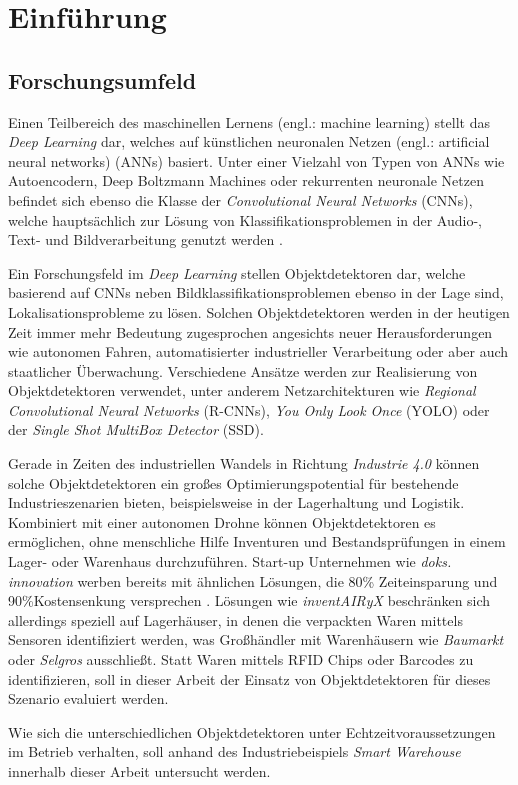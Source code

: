 \chapter{Einführung}

\section{Forschungsumfeld}

Einen Teilbereich des maschinellen Lernens (engl.: machine learning) stellt das \textit{Deep Learning} dar, welches auf künstlichen neuronalen Netzen (engl.: artificial neural networks) (ANNs) basiert. Unter einer Vielzahl von Typen von ANNs wie Autoencodern, Deep Boltzmann Machines oder rekurrenten neuronale Netzen befindet sich ebenso die Klasse der \textit{Convolutional Neural Networks} (CNNs), welche hauptsächlich zur Lösung von Klassifikationsproblemen in der Audio-, Text- und Bildverarbeitung genutzt werden \cite{AurelienGeron.2018,TaoWangDavidJ.WuAdamCoatesAndrewY.Ng.2012}.

Ein Forschungsfeld im \textit{Deep Learning} stellen Objektdetektoren dar, welche basierend auf CNNs neben Bildklassifikationsproblemen ebenso in der Lage sind, Lokalisationsprobleme zu lösen. Solchen Objektdetektoren werden in der heutigen Zeit immer mehr Bedeutung zugesprochen angesichts neuer Herausforderungen wie autonomen Fahren, automatisierter industrieller Verarbeitung oder aber auch staatlicher Überwachung. Verschiedene Ansätze werden zur Realisierung von Objektdetektoren verwendet, unter anderem Netzarchitekturen wie \textit{Regional Convolutional Neural Networks} (R-CNNs), \textit{You Only Look Once} (YOLO) oder der \textit{Single Shot MultiBox Detector} (SSD). 

Gerade in Zeiten des industriellen Wandels in Richtung \textit{Industrie 4.0} können solche Objektdetektoren ein großes Optimierungspotential für bestehende Industrieszenarien bieten, beispielsweise in der Lagerhaltung und Logistik. Kombiniert mit einer autonomen Drohne können Objektdetektoren es ermöglichen, ohne menschliche Hilfe Inventuren und Bestandsprüfungen in einem Lager- oder Warenhaus durchzuführen. Start-up Unternehmen wie \textit{doks. innovation} werben bereits mit ähnlichen Lösungen, die 80\% Zeiteinsparung und 90\%Kostensenkung versprechen \cite{doks.innovation.2019}. Lösungen wie \textit{inventAIRyX} beschränken sich allerdings speziell auf Lagerhäuser, in denen die verpackten Waren mittels Sensoren identifiziert werden, was Großhändler mit Warenhäusern wie \textit{Baumarkt} oder \textit{Selgros} ausschließt. Statt Waren mittels RFID Chips oder Barcodes zu identifizieren, soll in dieser Arbeit der Einsatz von Objektdetektoren für dieses Szenario evaluiert werden.

Wie sich die unterschiedlichen Objektdetektoren unter Echtzeitvoraussetzungen im Betrieb verhalten, soll anhand des Industriebeispiels \textit{Smart Warehouse} innerhalb dieser Arbeit untersucht werden. 

